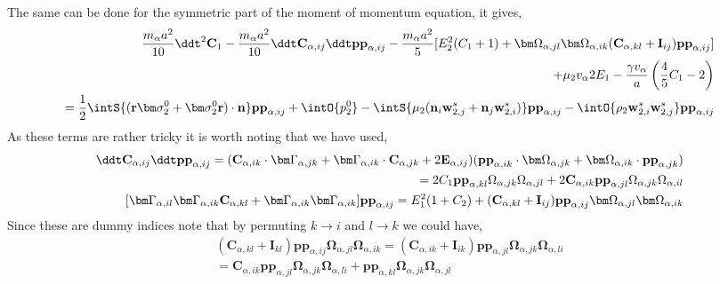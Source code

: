 The same can be done for the symmetric part of the moment of momentum equation, it gives, 
\begin{align*}
    \frac{m_\alpha a^2}{10}\ddt^2 \textbf{C}_1
    - \frac{m_\alpha a^2}{10}\ddt \textbf{C}_{\alpha,ij} \ddt \textbf{pp}_{\alpha,ij}
    - \frac{m_\alpha a^2}{5}[
        E_2^2(C_1 + 1)
        +
        \bm\Omega_{\alpha,jl}\bm\Omega_{\alpha,ik} (\textbf{C}_{\alpha,kl} + \textbf{I}_{ij})\textbf{pp}_{\alpha,ij}
    ] \\
    + \mu_2 v_\alpha 2E_1
    - \frac{ \gamma v_\alpha }{ a} \left(\frac{4}{5}
        C_1
        -2 
    \right)\nonumber\\
    = \frac{1}{2}\intS{(\textbf{r}\bm\sigma_2^0+ \bm\sigma_2^0\textbf{r})\cdot \textbf{n}}\textbf{pp}_{\alpha,ij}
    + \intO{p_2^0 }
    - \intS{\mu_2 (\textbf{n}_i \textbf{w}_{2,j}^s + \textbf{n}_j \textbf{w}_{2,i}^s)}\textbf{pp}_{\alpha,ij}
    - \intO{\rho_2 \textbf{w}_{2,i}^s\textbf{w}_{2,j}^s} \textbf{pp}_{\alpha,ij}
\end{align*}
As these terms are rather tricky it is worth noting that we have used,  
\begin{align*}
    \ddt \textbf{C}_{\alpha,ij} \ddt \textbf{pp}_{\alpha,ij}
    = (\textbf{C}_{\alpha,ik} \cdot \bm\Gamma_{\alpha,jk}
    +  \bm\Gamma_{\alpha,ik} \cdot \textbf{C}_{\alpha,jk}
    +  2\textbf{E}_{\alpha,ij} )
    (\textbf{pp}_{\alpha,ik} \cdot \bm\Omega_{\alpha,jk}
    +  \bm\Omega_{\alpha,ik} \cdot \textbf{pp}_{\alpha,jk})\\
    =
    2 C_1 \textbf{pp}_{\alpha,kl}\Omega_{\alpha,jk}\Omega_{\alpha,jl}
    + 2 \textbf{C}_{\alpha,ik} \textbf{pp}_{\alpha,jl}
    \Omega_{\alpha,jk}\Omega_{\alpha,il}\\
    [ \bm\Gamma_{\alpha,il}\bm\Gamma_{\alpha,ik} \textbf{C}_{\alpha,kl} 
        + \bm\Gamma_{\alpha,ik}\bm\Gamma_{\alpha,ik} ]
    \textbf{pp}_{\alpha,ij}
    =
    E_1^2(1+C_2) + (\textbf{C}_{\alpha,kl} + \textbf{I}_{ij})  \textbf{pp}_{\alpha,ij} \bm\Omega_{\alpha,jl}\bm\Omega_{\alpha,ik}
\end{align*}
Since these are dummy indices note that by permuting $k\to i$ and $l\to k$ we could have, 
\begin{align*}
    (\textbf{C}_{\alpha,kl} + \textbf{I}_{kl})  \textbf{pp}_{\alpha,ij} \bm\Omega_{\alpha,jl}\bm\Omega_{\alpha,ik}
    = 
    (\textbf{C}_{\alpha,ik} + \textbf{I}_{ik})  
    \textbf{pp}_{\alpha,jl} 
    \bm\Omega_{\alpha,jk}
    \bm\Omega_{\alpha,li}\\
    = 
    \textbf{C}_{\alpha,ik} 
    \textbf{pp}_{\alpha,jl} 
    \bm\Omega_{\alpha,jk}
    \bm\Omega_{\alpha,li}
    + 
    \textbf{pp}_{\alpha,kl} \bm\Omega_{\alpha,jk} \bm\Omega_{\alpha,jl}
    \\
\end{align*}
